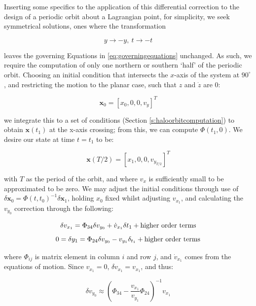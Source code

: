 \noindent Inserting some specifics to the application of this differential correction to the design of a periodic orbit about a Lagrangian point, for simplicity, we seek symmetrical solutions, ones where the transformation

\begin{equation}
y \rightarrow -y, ~t \rightarrow -t
\end{equation}

\noindent leaves the governing Equations in \ref{eq:governingequations} unchanged. As such, we require the computation of only one northern or southern `half' of the periodic orbit. Choosing an initial condition that intersects the $x$-axis of the system at $90^\circ$, and restricting the motion to the planar case, such that $z$ and $\dot{z}$ are $0$:

\begin{equation}
\pmb{x}_0 = [x_0, 0, 0, v_y]^T
\end{equation}

\noindent we integrate this to a set of conditions (Section \ref{s:haloorbitcomputation}) to obtain $\pmb{x}(t_1)$ at the x-axis crossing; from this, we can compute $\Phi(t_1, 0)$. We desire our state at time $t=t_1$ to be:

\begin{equation}
\pmb{x}(T/2) = \left[x_1, 0, 0, v_{y_{T/2}}\right]^T
\end{equation}

\noindent with $T$ as the period of the orbit, and where $v_x$ is sufficiently small to be approximated to be zero. We may adjust the initial conditions through use of $\delta \pmb{x}_0 = \Phi (t, t_0)^{-1}\delta\pmb{x}_1$, holding $x_0$ fixed whilst adjusting $v_{x_1}$, and calculating the $v_{y_0}$ correction through the following:

\begin{equation}
\delta v_{x_1} = \Phi_{34}\delta v_{y_0} + \dot{v}_{x_1}\delta t_1 + \textnormal{higher order terms}
\end{equation}
\begin{equation}
0 = \delta y_1 = \Phi_{24} \delta v_{y_0} - v_{y_1}\delta_{t_1} + \textnormal{higher order terms}
\end{equation}

\noindent where $\Phi_{ij}$ is matrix element in column $i$ and row $j$, and $\dot{v}_{x_1}$ comes from the equations of motion. Since $v_{x_1} = 0$, $\delta v_{x_1} = v_{x_1}$, and thus:

\begin{equation}
\delta v_{y_0} \approx \left(\Phi_{34} - \frac{v_{x_1}}{v_{y_1}}\Phi_{24} \right)^{-1} v_{x_1}
\end{equation}

